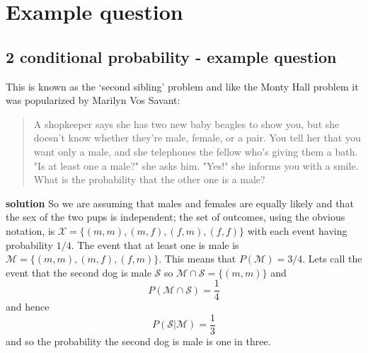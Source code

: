 
\ifind
\section*{Example question}
\else
\subsection*{2 conditional probability - example question}
\fi

This is known as the `second sibling' problem and like the Monty Hall problem it was popularized by Marilyn Vos Savant:
\begin{quote}
 A shopkeeper says she has two new baby beagles to show you, but
    she doesn't know whether they're male, female, or a pair. You tell
    her that you want only a male, and she telephones the fellow who's
    giving them a bath. "Is at least one a male?" she asks him. "Yes!"
    she informs you with a smile. What is the probability that the
    other one is a male?
\end{quote}

\noindent \textbf{solution} So we are assuming that males and females are equally likely and that the sex of the two pups is independent; the set of outcomes, using the obvious notation, is $\mathcal{X}=\{(m,m),(m,f),(f,m),(f,f)\}$ with each event having probability $1/4$. The event that at least one is male is $\mathcal{M}=\{(m,m),(m,f),(f,m)\}$. This means that $P(\mathcal{M})=3/4$. Lets call the event that the second dog is male $\mathcal{S}$ so $\mathcal{M}\cap\mathcal{S}=\{(m,m)\}$ and
\begin{equation}
P(\mathcal{M}\cap\mathcal{S})=\frac{1}{4}
\end{equation}
and hence
\begin{equation}
P(\mathcal{S}|\mathcal{M})=\frac{1}{3}
\end{equation}
and so the probability the second dog is male is one in three.

